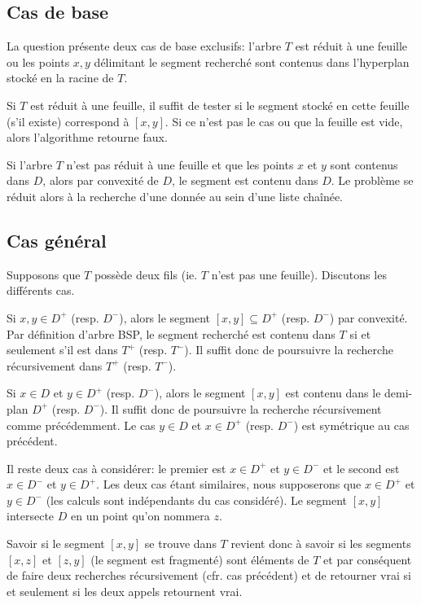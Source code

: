 
\subsection{Cas de base}
La question présente deux cas de base exclusifs: l'arbre $T$ est
réduit à une feuille ou les points $x, y$ délimitant le segment
recherché sont contenus dans l'hyperplan stocké en la racine de $T$.

Si $T$ est réduit à une feuille, il suffit de tester si le segment
stocké en cette feuille (s'il existe) correspond à $[x, y]$. Si ce
n'est pas le cas ou que la feuille est vide, alors l'algorithme
retourne faux.

Si l'arbre $T$ n'est pas réduit à une feuille et que
les points $x$ et $y$ sont contenus dans $D$, alors par convexité
de $D$, le segment est contenu dans $D$. Le problème se réduit alors
à la recherche d'une donnée au sein d'une liste chaînée.

\subsection{Cas général}
Supposons que $T$ possède deux fils (ie. $T$ n'est pas une feuille).
Discutons les différents cas.

Si $x,y \in D^+$ (resp. $D^-$), alors le segment $[x,y] \subseteq D^+$
(resp. $D^-$) par convexité. Par définition d'arbre BSP,
le segment recherché est contenu dans $T$ si et seulement s'il
est dans $T^+$ (resp. $T^-$). Il suffit donc de poursuivre la
recherche récursivement dans $T^+ $ (resp. $T^-$).

Si $x \in D $ et $y \in D^+$ (resp. $D^-$), alors le segment $[x, y]$ est
contenu dans le demi-plan $D^+$ (resp. $D^-$). Il suffit donc de poursuivre la
recherche récursivement comme précédemment. Le cas $y \in D $ et $x \in D^+$
(resp. $D^-$) est symétrique au cas précédent.

Il reste deux cas à considérer: le premier est $ x \in D^+$ et $ y \in D^-$ et
le second est $x \in D^-$ et $ y \in D^+$. Les deux cas étant similaires,
nous supposerons que $ x \in D^+$ et $ y \in D^-$ (les calculs sont
indépendants du cas considéré).
Le segment $[x,y]$ intersecte $D$ en un point qu'on nommera $z$.

Savoir si le segment $[x,y]$ se trouve dans $T$ revient donc à savoir si
les segments $[x,z]$ et $[z,y]$ (le segment est fragmenté) sont
éléments de $T$ et par conséquent de faire deux recherches
récursivement (cfr. cas précédent) et de retourner vrai si et
seulement si les deux appels retournent vrai.

